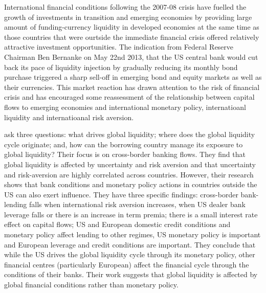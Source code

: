 \documentclass[12pt, a4paper, oneside]{article} %
\begin{document}

International financial conditions following the 2007-08 crisis have fuelled the growth of investments in transition and emerging economies by providing large amount of funding-currency liquidity in developed economies at the same time as those countries that were ourtside the immediate financial crisis offered relatively attractive investment opportunities. The indication from Federal Reserve Chairman Ben Bernanke on May 22nd 2013, that the US central bank would cut back its pace of liquidity injection by gradually reducing its monthly bond purchase triggered a sharp sell-off in emerging bond and equity markets as well as their currencies.  This market reaction has drawn attention to the risk of financial crisis and has encouraged some reassessment of the relationship between capital flows to emerging economies and international monetary policy, internatioanl liquidity and internatioanal risk aversion.  

\citet{Cerutti2014} ask three questions:  what drives global liquidity; where does the global liquidity cycle originate; and, how can the borrowing country manage its exposure to global liquidity? Their focus is on cross-border banking flows. They find that global liquidity is affected by uncertainty and risk aversion and that uncertainty and risk-aversion are highly correlated across countries. However, their research shows that bank conditions and monetary policy actions in countries outside the US can also exert influence. They have three specific findings:  cross-border bank-lending falls when international risk aversion increases, when US dealer bank leverage falls or there is an increase in term premia; there is a small interest rate effect on capital flows; US and European domestic credit conditions and monetary policy affect lending to other regimes, US monetary policy is important and European leverage and credit conditions are important.  They conclude that while the US drives the global liquidity cycle through its monetary policy, other financial centres (particularly European) affect the financial cycle through the conditions of their banks. Their work suggests that global liquidity is affected by global financial conditions rather than monetary policy.
\end{document}
